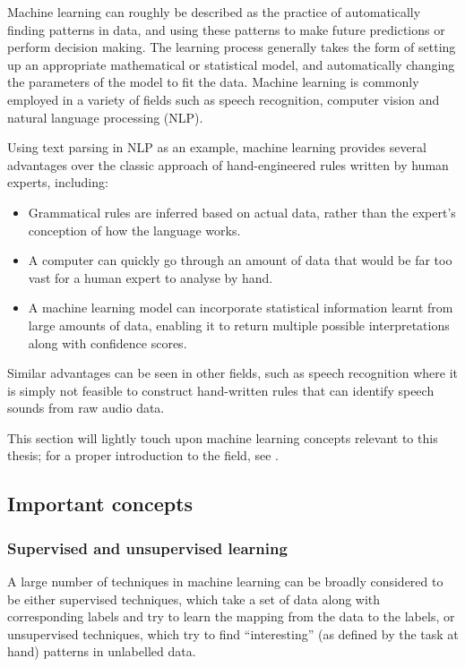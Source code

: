 Machine learning can roughly be described as the practice of automatically finding patterns in data, and using these patterns to make future predictions or perform decision making.
The learning process generally takes the form of setting up an appropriate mathematical or statistical model, and automatically changing the parameters of the model to fit the data.
Machine learning is commonly employed in a variety of fields such as speech recognition, computer vision and natural language processing (NLP).

Using text parsing in NLP as an example, machine learning provides several advantages over the classic approach of hand-engineered rules written by human experts, including:
\begin{itemize}
 \item Grammatical rules are inferred based on actual data, rather than the expert's conception of how the language works.
 \item A computer can quickly go through an amount of data that would be far too vast for a human expert to analyse by hand.
 \item A machine learning model can incorporate statistical information learnt from large amounts of data, enabling it to return multiple possible interpretations along with confidence scores.
\end{itemize}
Similar advantages can be seen in other fields, such as speech recognition where it is simply not feasible to construct hand-written rules that can identify speech sounds from raw audio data.

This section will lightly touch upon machine learning concepts relevant to this thesis; for a proper introduction to the field, see \textcite{murphy2012machine}.

\subsection{Important concepts}
\subsubsection{Supervised and unsupervised learning}

A large number of techniques in machine learning can be broadly considered to be either supervised techniques, which take a set of data along with corresponding labels and try to learn the mapping from the data to the labels, or unsupervised techniques, which try to find ``interesting'' (as defined by the task at hand) patterns in unlabelled data.

